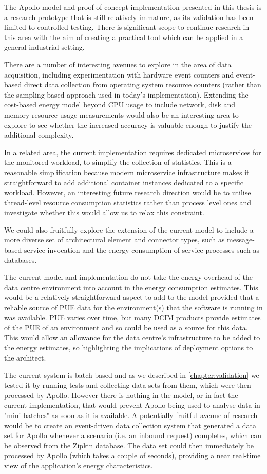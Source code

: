 The Apollo model and proof-of-concept implementation presented in this thesis is a research prototype that is still relatively immature, as its validation has been limited to controlled testing.  There is significant scope to continue research in this area with the aim of creating a practical tool which can be applied in a general industrial setting.

There are a number of interesting avenues to explore in the area of data acquisition, including experimentation with hardware event counters and event-based direct data collection from operating system resource counters (rather than the sampling-based approach used in today's implementation).  Extending the cost-based energy model beyond CPU usage to include network, disk and memory resource usage measurements would also be an interesting area to explore to see whether the increased accuracy is valuable enough to justify the additional complexity.

In a related area, the current implementation requires dedicated microservices for the monitored workload, to simplify the collection of statistics.  This is a reasonable simplification because modern microservice infrastructure makes it straightforward to add additional container instances dedicated to a specific workload.  However, an interesting future research direction would be to utilise thread-level resource consumption statistics rather than process level ones and investigate whether this would allow us to relax this constraint.

We could also fruitfully explore the extension of the current model to include a more diverse set of architectural element and connector types, such as message-based service invocation and the energy consumption of service processes such as databases.

The current model and implementation do not take the energy overhead of the data centre environment into account in the energy consumption estimates.  This would be a relatively straightforward aspect to add to the model provided that a reliable source of PUE data for the environment(s) that the software is running in was available.  PUE varies over time, but many DCIM products provide estimates of the PUE of an environment and so could be used as a source for this data.  This would allow an allowance for the data centre's infrastructure to be added to the energy estimates, so highlighting the implications of deployment options to the architect.

The current system is batch based and as we described in \cref{chapter:validation} we tested it by running tests and collecting data sets from them, which were then processed by Apollo.  However there is nothing in the model, or in fact the current implementation, that would prevent Apollo being used to analyse data in "mini batches" as soon as it is available.  A potentially fruitful avenue of research would be to create an event-driven data collection system that generated a data set for Apollo whenever a scenario (i.e. an inbound request) completes, which can be observed from the Zipkin database.  The data set could then immediately be processed by Apollo (which takes a couple of seconds), providing a near real-time view of the application's energy characteristics.


